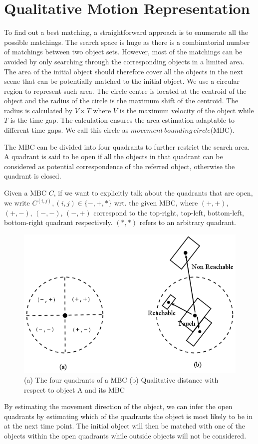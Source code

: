 \documentclass[letterpaper]{article}
\begin{document}
\section{Qualitative Motion Representation}

 To find out a best matching, a straightforward approach is to enumerate all the possible matchings. The search space is huge as there is a combinatorial number of matchings between two object sets. However, most of the matchings can be avoided by only searching through the corresponding objects in a limited area. The area of the initial object should therefore cover all the objects in the next scene that can be potentially matched to the initial object.  We use a circular region to represent such area. The circle centre is located at the centroid of the object and the radius of the circle is the maximum shift of the centroid. The radius is calculated by $V \times T$ where $V$ is the maximum velocity of the object while $T$ is the time gap. The calculation ensures the area estimation adaptable to different time gaps. We call this circle as $movement\,bounding\,circle$(MBC). 

The MBC can be divided into four quadrants to further restrict the search area. A quadrant is said to be open if all the objects in that quadrant can be considered as potential correspondence of the referred object, otherwise the quadrant is closed.  

 Given a MBC $C$, if we want to explicitly talk about the quadrants that are open, we write $C^{(i,j)}, (i,j) \in \{-, +, *\}$ wrt. the given MBC, where $(+,+)$, $(+,-)$, $(-,-)$, $(-,+)$ correspond to the top-right, top-left, bottom-left, bottom-right quadrant respectively. $(*, *)$ refers to an arbitrary quadrant. 
\begin{figure}[h!]
\centering\includegraphics[scale=0.3]{quadrants.png}\caption{(a) The four quadrants of a MBC (b) Qualitative distance with respect to object A and its MBC}
\end{figure}
By estimating the movement direction of the object, we can infer the open quadrants by estimating which of the quadrants the object is most likely to be in at the next time point. The initial object will then be matched with one of the objects within the open quadrants while outside objects will not be considered.
\end{document}

